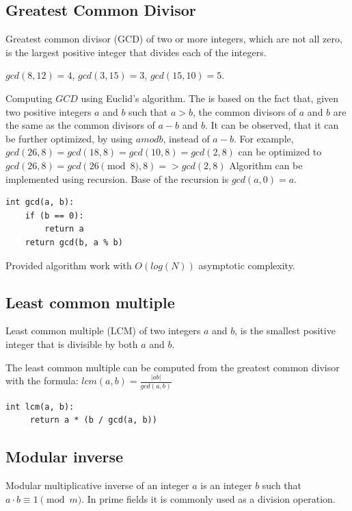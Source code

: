 \documentclass[../lecture-notes.tex]{subfiles}
\begin{document}
\subsection{Greatest Common Divisor}

Greatest common divisor (GCD) of two or more integers, which are not all zero, is the largest positive integer that divides each of the integers. 

\begin{example}
    $gcd(8, 12) = 4$, 
    $gcd(3, 15) = 3$, 
    $gcd(15, 10) = 5$.
\end{example}

Computing $GCD$ using Euclid's algorithm. 
The is based on the fact that, given two positive integers $a$ and $b$ such that $a > b$, 
the common divisors of $a$ and $b$ are the same as the common divisors of $a - b$ and $b$. 
It can be observed, that it can be further optimized, by using $a mod b$, instead of $a - b$. 
For example, $gcd(26, 8) = gcd(18, 8) = gcd(10, 8) = gcd(2, 8)$ can be optimized to $gcd(26, 8) = gcd(26 \pmod{8}, 8) => gcd(2, 8)$
Algorithm can be implemented using recursion. Base of the recursion is $gcd(a, 0) = a$.

\begin{lstlisting}[]
   int gcd(a, b):
    if (b == 0):
        return a
    return gcd(b, a % b)
\end{lstlisting}

Provided algorithm work with $O(log(N))$ asymptotic complexity.

\subsection{Least common multiple}

Least common multiple (LCM) of two integers $a$ and $b$, is the smallest positive integer that is divisible by both $a$ and $b$.

The least common multiple can be computed from the greatest common divisor with the formula:
$lcm(a, b) = \frac{|ab|}{gcd(a,b)}$

\begin{lstlisting}[]
    int lcm(a, b):
     return a * (b / gcd(a, b))
 \end{lstlisting}

 \subsection{Modular inverse}

Modular multiplicative inverse of an integer $a$ is an integer $b$ such that $a \cdot b \equiv 1 \pmod{m}$. 
In prime fields it is commonly used as a division operation.
\end{document}
